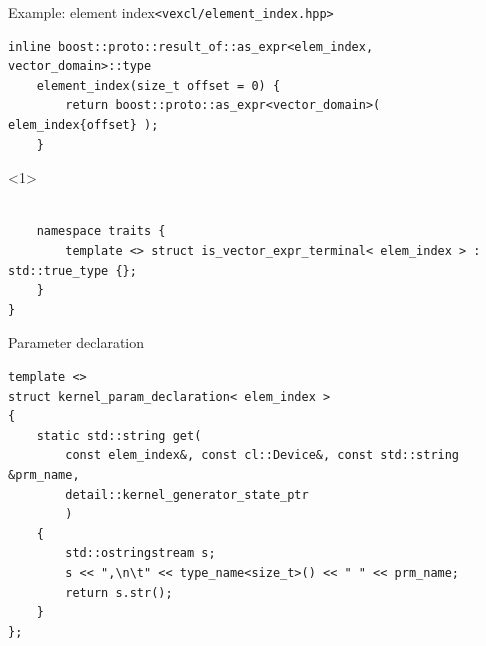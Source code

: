 \documentclass[@BEAMER_OPTIONS@]{beamer}
\newcommand{\code}[1]{\lstinline|#1|}
\begin{document}
\begin{frame}[fragile]{Example: element index}{\code{<vexcl/element_index.hpp>}}
\begin{exampleblock}{}
\begin{onlyenv}
\begin{uncoverenv}
\begin{lstlisting}[firstnumber=last]
    inline boost::proto::result_of::as_expr<elem_index, vector_domain>::type
    element_index(size_t offset = 0) {
        return boost::proto::as_expr<vector_domain>( elem_index{offset} );
    }
            \end{lstlisting}
        \end{uncoverenv}
        \begin{uncoverenv}<1>
            \begin{lstlisting}[firstnumber=last]

    namespace traits {
        template <> struct is_vector_expr_terminal< elem_index > : std::true_type {};
    }
}
            \end{lstlisting}
        \end{uncoverenv}
        \end{onlyenv}
    \end{exampleblock}
\end{frame}

\note{ }

\begin{frame}[fragile]{Parameter declaration}
    \begin{exampleblock}{}
        \begin{lstlisting}
template <>
struct kernel_param_declaration< elem_index >
{
    static std::string get(
        const elem_index&, const cl::Device&, const std::string &prm_name,
        detail::kernel_generator_state_ptr
        )
    {
        std::ostringstream s;
        s << ",\n\t" << type_name<size_t>() << " " << prm_name;
        return s.str();
    }
};
        \end{lstlisting}
    \end{exampleblock}
\end{frame}

\note{ }
\end{document}
